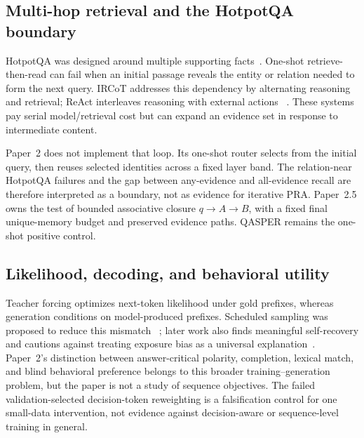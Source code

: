 \documentclass[11pt]{article}
\begin{document}
\subsection{Multi-hop retrieval and the HotpotQA boundary}

HotpotQA was designed around multiple supporting facts~\cite{yang2018hotpotqa}. One-shot
retrieve-then-read can fail when an initial passage reveals the entity or relation needed to
form the next query. IRCoT addresses this dependency by alternating reasoning and retrieval;
ReAct interleaves reasoning with external actions
~\cite{trivedi2023ircot,yao2023react}. These systems pay serial model/retrieval cost but can
expand an evidence set in response to intermediate content.

Paper~2 does not implement that loop. Its one-shot router selects from the initial query, then
reuses selected identities across a fixed layer band. The relation-near HotpotQA failures and
the gap between any-evidence and all-evidence recall are therefore interpreted as a boundary,
not as evidence for iterative PRA. Paper~2.5 owns the test of bounded associative closure
$q\rightarrow A\rightarrow B$, with a fixed final unique-memory budget and preserved evidence
paths. QASPER remains the one-shot positive control.

\subsection{Likelihood, decoding, and behavioral utility}

Teacher forcing optimizes next-token likelihood under gold prefixes, whereas generation
conditions on model-produced prefixes. Scheduled sampling was proposed to reduce this mismatch
~\cite{bengio2015scheduled}; later work also finds meaningful self-recovery and cautions against
treating exposure bias as a universal explanation~\cite{he2021exposure}. Paper~2's distinction
between answer-critical polarity, completion, lexical match, and blind behavioral preference
belongs to this broader training--generation problem, but the paper is not a study of sequence
objectives. The failed validation-selected decision-token reweighting is a falsification control
for one small-data intervention, not evidence against decision-aware or sequence-level training
in general.
\end{document}
